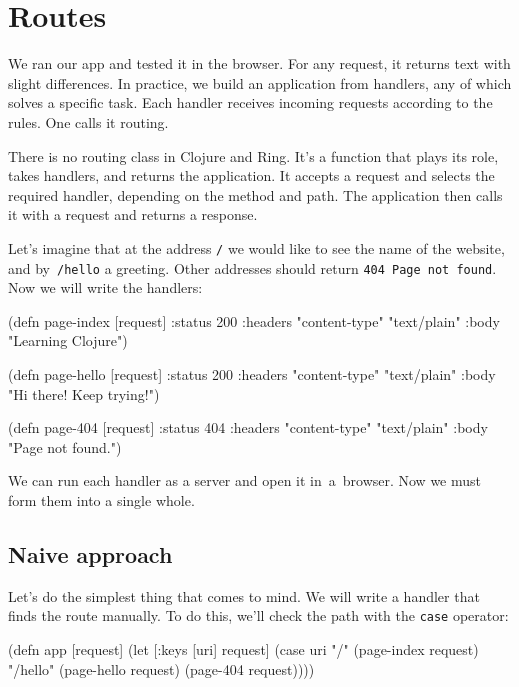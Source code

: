 \section{Routes}


We ran our app and tested it in the browser. For any request, it returns text with slight differences. In practice, we build an application from handlers, any of which solves a specific task. Each handler receives incoming requests according to the rules. One calls it routing.

There is no routing class in Clojure and Ring. It's a function that plays its role, takes handlers, and returns the application. It accepts a request and selects the required handler, depending on the method and path. The application then calls it with a request and returns a response.


Let's imagine that at the address \verb|/| we would like to see the name of the website, and by~\verb|/hello| a greeting. Other addresses should return \verb|404 Page not found|. Now we will write the handlers:

\begin{clojure}
(defn page-index [request]
  {:status 200
   :headers {"content-type" "text/plain"}
   :body "Learning Clojure"})

(defn page-hello [request]
  {:status 200
   :headers {"content-type" "text/plain"}
   :body "Hi there! Keep trying!"})

(defn page-404 [request]
  {:status 404
   :headers {"content-type" "text/plain"}
   :body "Page not found."})
\end{clojure}

We can run each handler as a server and open it in~a~browser. Now we must form them into a single whole.

\subsection{Naive approach}

Let's do the simplest thing that comes to mind. We will write a handler that finds the route manually. To do this, we'll check the path with the \verb|case| operator:

\begin{clojure}
(defn app [request]
  (let [{:keys [uri]} request]
    (case uri
      "/"      (page-index request)
      "/hello" (page-hello request)
      (page-404 request))))
\end{clojure}

